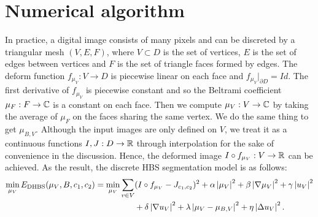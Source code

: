 \documentclass[review,onefignum,onetabnum]{siamonline190516}
\begin{document}
\section{Numerical algorithm}
In practice, a digital image consists of many pixels and can be discreted by a triangular mesh $(V, E, F)$, where $V \subset D$ is the set of vertices, $E$ is the set of edges between vertices and $F$ is the set of triangle faces formed by edges. The deform function $f_{\mu_V}: V \rightarrow D$ is piecewise linear on each face and $f_{\mu_V}|_{\partial D} = Id$. The first derivative of $f_{\mu_V}$ is piecewise constant and so the Beltrami coefficient $\mu_F: F \rightarrow \mathbb{C}$ is a constant on each face. Then we compute $\mu_V: V \rightarrow \mathbb{C}$ by taking the average of $\mu_F$ on the faces sharing the same vertex. We do the same thing to get $\mu_{B,V}$. Although the input images are only defined on $V$, we treat it as a continuous functions $I, J: D \rightarrow \mathbb{R}$ through interpolation for the sake of convenience in the discussion. Hence, the deformed image $I \circ f_{\mu_V}: V \rightarrow \mathbb{R}$ can be achieved. As the result, the discrete HBS segmentation model is as follows:
\begin{equation}\label{discrete hbs seg model}
    \begin{split}
        \min_{\mu_V} E_{\text{DHBS}}(\mu_V, B, c_1, c_2) = 
        \min_{\mu_V} \sum_{v \in V}
        & (I \circ f_{\mu_V} - J_{c_1,c_2})^2 
        + \alpha \abs{\mu_V}^2 + \beta \abs{\nabla \mu_V}^2 
        + \gamma \abs{u_V}^2 \\
        & + \delta \abs{\nabla u_V}^2
        + \lambda \abs{\mu_V - \mu_{B,V}}^2 + \eta \abs{\Delta u_V}^2.
    \end{split}
\end{equation}
\end{document}
